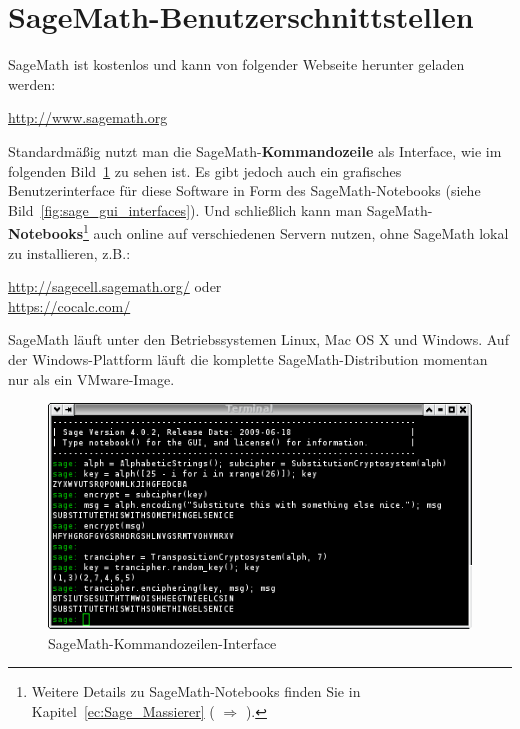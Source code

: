 \section*{SageMath-Benutzerschnittstellen}
SageMath ist kostenlos und kann von folgender Webseite herunter geladen werden:
\begin{center}
  \url{http://www.sagemath.org} \\
\end{center}
Standardmäßig nutzt man die SageMath-{\bf Kommandozeile} als Interface, wie im
folgenden Bild~\ref{fig:sage_cmd_interfaces} zu sehen ist.
Es gibt jedoch auch ein grafisches Benutzerinterface für diese Software
in Form des SageMath-Notebooks (siehe Bild~\ref{fig:sage_gui_interfaces}).
Und schließlich kann man SageMath-{\bf Notebooks}\footnote{%
Weitere Details zu SageMath-Notebooks finden Sie in
Kapitel~\ref{ec:Sage_Massierer}
(\glqq {}\grqq
  $\Rightarrow$ \glqq {}\grqq).
                      }
auch online auf verschiedenen Servern nutzen, ohne SageMath lokal zu installieren, z.B.:
\begin{center}
\url{http://sagecell.sagemath.org/} oder \\
\url{https://cocalc.com/}
\end{center}

SageMath läuft unter den Betriebssystemen Linux, Mac OS X und Windows.
Auf der Windows-Plattform läuft die komplette SageMath-Distribution momentan
nur als ein VMware-Image.

\begin{figure}[!htpb]
\centering
\includegraphics[scale=0.6]{figures/sage-cmd}
\caption{SageMath-Kommandozeilen-Interface}
\label{fig:sage_cmd_interfaces}
\end{figure}

